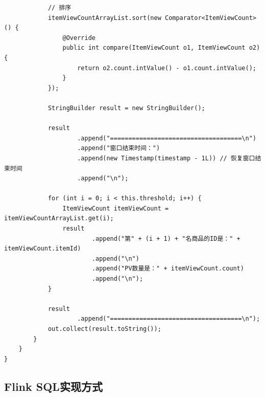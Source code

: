 \documentclass[cn,11pt,chinese]{elegantbook}
\begin{document}
\begin{verbatim}
            // 排序
            itemViewCountArrayList.sort(new Comparator<ItemViewCount>() {
                @Override
                public int compare(ItemViewCount o1, ItemViewCount o2) {
                    return o2.count.intValue() - o1.count.intValue();
                }
            });

            StringBuilder result = new StringBuilder();

            result
                    .append("====================================\n")
                    .append("窗口结束时间：")
                    .append(new Timestamp(timestamp - 1L)) // 恢复窗口结束时间
                    .append("\n");

            for (int i = 0; i < this.threshold; i++) {
                ItemViewCount itemViewCount = itemViewCountArrayList.get(i);
                result
                        .append("第" + (i + 1) + "名商品的ID是：" + itemViewCount.itemId)
                        .append("\n")
                        .append("PV数量是：" + itemViewCount.count)
                        .append("\n");
            }

            result
                    .append("====================================\n");
            out.collect(result.toString());
        }
    }
}
\end{verbatim}

\subsection{Flink SQL实现方式}
\end{document}
